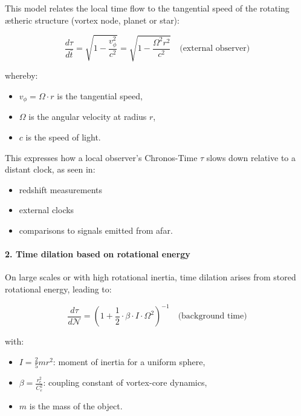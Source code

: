 This model relates the local time flow to the tangential speed of the rotating ætheric structure (vortex node, planet or star):

\begin{equation}
    \frac{d\tau}{d\bar{t}} =
    \sqrt{1 - \frac{v_\phi^2}{c^2}} =
    \sqrt{1 - \frac{\Omega^2 r^2}{c^2}} \quad \text{(external observer)}
\end{equation}

whereby:
\begin{itemize}
    \item \( v_\phi = \Omega \cdot r \) is the tangential speed,
    \item \( \Omega \) is the angular velocity at radius \( r \),
    \item \( c \) is the speed of light.
\end{itemize}

This expresses how a local observer's Chronos-Time $\tau$ slows down relative to a distant clock, as seen in:
\begin{itemize}
\item redshift measurements
\item external clocks
\item comparisons to signals emitted from afar.
\end{itemize}



\paragraph{2. Time dilation based on rotational energy}

On large scales or with high rotational inertia, time dilation arises from stored rotational energy, leading to:

\begin{equation}
   \frac{d\tau}{d\mathcal{N}} = \left(1 + \frac{1}{2} \cdot \beta \cdot I \cdot \Omega^2 \right)^{-1} \quad \text{(background time)}
\end{equation}

with:
\begin{itemize}
    \item \( I = \frac{2}{5} m r^2 \): moment of inertia for a uniform sphere,
    \item \( \beta = \frac{r_c^2}{C_e^2} \): coupling constant of vortex-core dynamics,
    \item \( m \) is the mass of the object.
\end{itemize}

